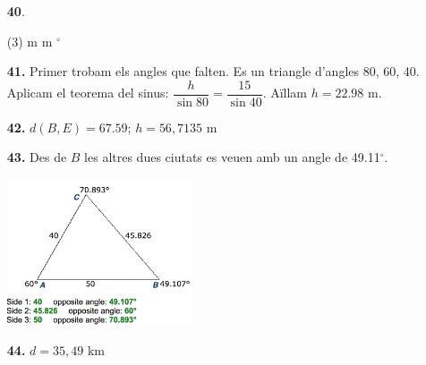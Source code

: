 \documentclass[a4paper, pdf, twoside]{book}
\begin{document}
\begin{multicols}{2}
\begin{enumerate}
 \item[\fontfamily{phv}\selectfont\color{blue}\textbf{40}. ] 
 \begin{tasks}[column-sep=1em, item-indent=1.3333em](3)
	  m
	  m
	 $^\circ $
\end{tasks}
\vspace{0.25cm}
\item[\fontfamily{phv}\selectfont\color{blue}\textbf{41. }] 
Primer trobam els angles que falten. Es un triangle d'angles 80, 60, 40. Aplicam el teorema del sinus: $\dfrac {h}{\sin 80}=\dfrac {15}{\sin 40}$. Aïllam $h =22.98$ m.
\vspace{0.25cm}
\item[\fontfamily{phv}\selectfont\color{blue}\textbf{42. }] 
$d(B, E) = 67.59$; $h = 56,7135$ m
\vspace{0.25cm}
\item[\fontfamily{phv}\selectfont\color{blue}\textbf{43. }] 
Des de $B$ les altres dues ciutats es veuen amb un angle de 49.11$^\circ $. \par \includegraphics [width=0.43\textwidth ]{img-sol/t3-43}
\vspace{0.25cm}
\item[\fontfamily{phv}\selectfont\color{blue}\textbf{44. }]  \scalebox{0.6}{\simbolclau } 
$d=35,49$ km
 \end{enumerate}
\vspace{0.3cm}



\end{multicols}
\end{document}
